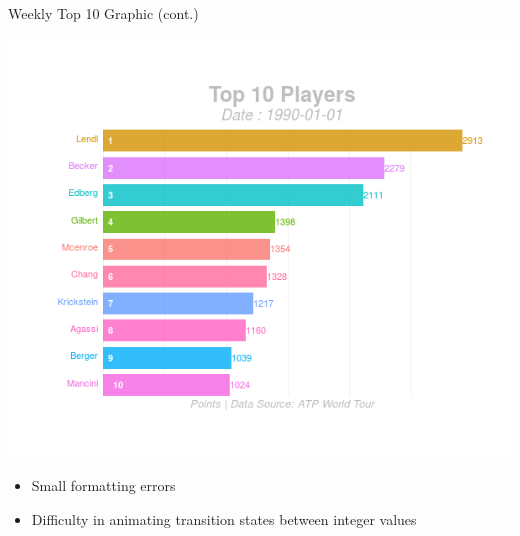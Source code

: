 \documentclass[ignorenonframetext,]{beamer}
\providecommand{\tightlist}{%
  \setlength{\itemsep}{0pt}\setlength{\parskip}{0pt}}
\begin{document}
\begin{frame}{Weekly Top 10 Graphic (cont.)}
\protect\hypertarget{weekly-top-10-graphic-cont.-2}{}

\includegraphics{gganim_test3.gif}

\begin{itemize}[<+->]
\tightlist
\item
  Small formatting errors
\item
  Difficulty in animating transition states between integer values
\end{itemize}

\end{frame}
\end{document}
